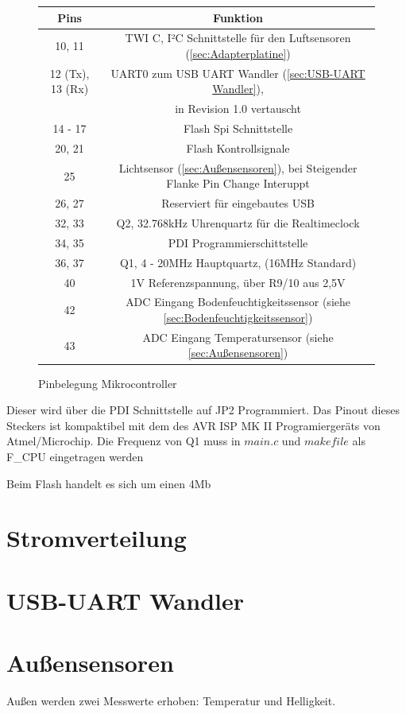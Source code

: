\documentclass[12pt, a4paper, oneside]{report}
\begin{document}
\begin{figure}[h]
	\centering
\begin{tabular}{c|c}
	Pins & Funktion\\
	\hline
	10, 11 & TWI C, I²C Schnittstelle für den Luftsensoren 
	(\autoref{sec:Adapterplatine})\\
	12 (Tx), 13 (Rx)& UART0 zum USB UART Wandler (\autoref{sec:USB-UART Wandler}), \\&in Revision 1.0 vertauscht\\
	14 - 17 & Flash Spi Schnittstelle\\
	20, 21 & Flash Kontrollsignale\\
	25 & Lichtsensor (\autoref{sec:Außensensoren}), bei Steigender Flanke Pin Change Interuppt\\
	26, 27 & Reserviert für eingebautes USB\\
	32, 33 & Q2, 32.768kHz Uhrenquartz für die Realtimeclock\\
	34, 35 & PDI Programmierschittstelle\\
	36, 37 & Q1, 4 - 20MHz Hauptquartz, (16MHz Standard)\\
	40 & 1V Referenzspannung, über R9/10 aus 2,5V\\
	42 & ADC Eingang Bodenfeuchtigkeitssensor (siehe \autoref{sec:Bodenfeuchtigkeitssensor}) \\
	43 & ADC Eingang Temperatursensor (siehe \autoref{sec:Außensensoren})\\
\end{tabular}
	\caption{Pinbelegung Mikrocontroller}
\end{figure}
Dieser wird über die PDI Schnittstelle auf JP2 Programmiert. Das Pinout dieses Steckers ist kompaktibel mit dem des AVR ISP MK II Programiergeräts von Atmel/Microchip.
Die Frequenz von Q1 muss in $main.c$ und $makefile$ als F\_CPU eingetragen werden

Beim Flash handelt es sich um einen 4Mb 

\section{Stromverteilung}
\label{sec:Stromverteilung}

\section{USB-UART Wandler}
\label{sec:USB-UART Wandler}

\pagebreak
\section{Außensensoren}
\label{sec:Außensensoren}
Außen werden zwei Messwerte erhoben: Temperatur und Helligkeit.
\end{document}
